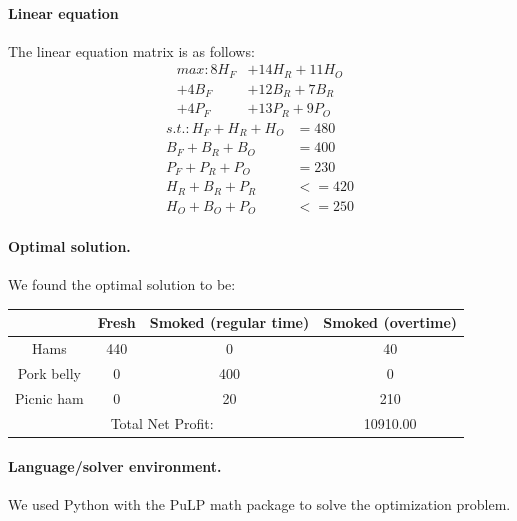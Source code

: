 \documentclass[11pt,letterpaper]{article}
\begin{document}
\paragraph{Linear equation} The linear equation matrix is as follows: \\
\begin{align*}
max: 8 H_F &+ 14 H_R + 11 H_O \\
+ 4 B_F &+ 12 B_R + 7 B_R \\ 
+ 4 P_F &+ 13 P_R + 9 P_O
\end{align*}
\begin{align*}
s.t.: H_F + H_R + H_O &= 480 \\
B_F + B_R + B_O &= 400 \\
P_F + P_R + P_O &= 230 \\
H_R + B_R + P_R &<= 420 \\
H_O + B_O + P_O &<= 250
\end{align*}

\paragraph{Optimal solution.} We found the optimal solution to be: \\
\begin{tabular}{|c|c|cc|}
\hline 
& Fresh & Smoked (regular time) & Smoked (overtime) \\ 
\hline 
Hams & 440 & 0 & 40 \\ 
Pork belly & 0 & 400 & 0 \\ 
Picnic ham & 0 & 20 & 210 \\ 
\hline 
\multicolumn{3}{|c}{Total Net Profit:} & 10910.00 \\ 
\hline 
\end{tabular} 

\paragraph{Language/solver environment.} We used Python with the PuLP math package to solve the optimization problem. 
\end{document}
